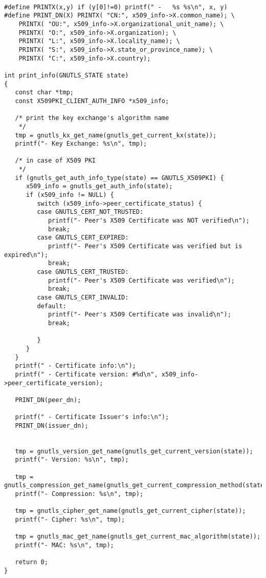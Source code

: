 \begin{verbatim}

#define PRINTX(x,y) if (y[0]!=0) printf(" -   %s %s\n", x, y)
#define PRINT_DN(X) PRINTX( "CN:", x509_info->X.common_name); \
	PRINTX( "OU:", x509_info->X.organizational_unit_name); \
	PRINTX( "O:", x509_info->X.organization); \
	PRINTX( "L:", x509_info->X.locality_name); \
	PRINTX( "S:", x509_info->X.state_or_province_name); \
	PRINTX( "C:", x509_info->X.country);

int print_info(GNUTLS_STATE state)
{
   const char *tmp;
   const X509PKI_CLIENT_AUTH_INFO *x509_info;

   /* print the key exchange's algorithm name
    */
   tmp = gnutls_kx_get_name(gnutls_get_current_kx(state));
   printf("- Key Exchange: %s\n", tmp);

   /* in case of X509 PKI
    */
   if (gnutls_get_auth_info_type(state) == GNUTLS_X509PKI) {
      x509_info = gnutls_get_auth_info(state);
      if (x509_info != NULL) {
         switch (x509_info->peer_certificate_status) {
         case GNUTLS_CERT_NOT_TRUSTED:
            printf("- Peer's X509 Certificate was NOT verified\n");
            break;
         case GNUTLS_CERT_EXPIRED:
            printf("- Peer's X509 Certificate was verified but is expired\n");
            break;
         case GNUTLS_CERT_TRUSTED:
            printf("- Peer's X509 Certificate was verified\n");
            break;
         case GNUTLS_CERT_INVALID:
         default:
            printf("- Peer's X509 Certificate was invalid\n");
            break;

         }
      }
   }
   printf(" - Certificate info:\n");
   printf(" - Certificate version: #%d\n", x509_info->peer_certificate_version);

   PRINT_DN(peer_dn);

   printf(" - Certificate Issuer's info:\n");
   PRINT_DN(issuer_dn);


   tmp = gnutls_version_get_name(gnutls_get_current_version(state));
   printf("- Version: %s\n", tmp);

   tmp = gnutls_compression_get_name(gnutls_get_current_compression_method(state));
   printf("- Compression: %s\n", tmp);

   tmp = gnutls_cipher_get_name(gnutls_get_current_cipher(state));
   printf("- Cipher: %s\n", tmp);

   tmp = gnutls_mac_get_name(gnutls_get_current_mac_algorithm(state));
   printf("- MAC: %s\n", tmp);

   return 0;
}

\end{verbatim}
